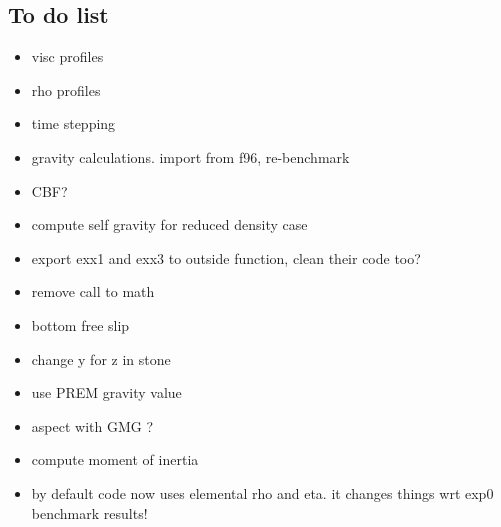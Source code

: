 \documentclass[a4paper,12pt]{article}
\begin{document}
\subsection{To do list}
\begin{itemize}
\item visc profiles
\item rho profiles
\item time stepping
\item gravity calculations. import from f96, re-benchmark
\item CBF? 
\item compute self gravity for reduced density case 
\item export exx1 and exx3 to outside function, clean their code too? 
\item remove call to math 
\item bottom free slip 
\item change y for z in stone
\item use PREM gravity value
\item aspect with GMG ?
\item compute moment of inertia
\item by default code now uses elemental rho and eta. it changes things wrt exp0 benchmark results!
\end{itemize}




 
\end{document}

